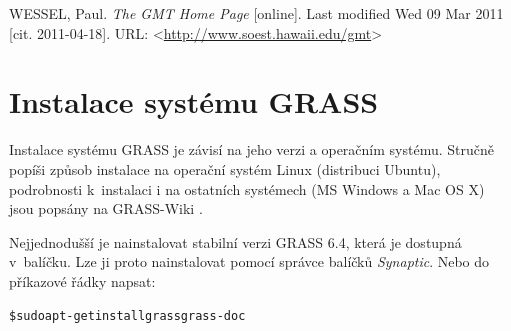 \documentclass[a4paper,12pt,draft]{article}
\begin{document}
\begin{thebibliography}{99}
WESSEL, Paul. \textit{The GMT Home Page} [online]. Last modified Wed 09 Mar 2011
[cit. 2011-04-18].
URL: \textless\url{http://www.soest.hawaii.edu/gmt}\textgreater








\end{thebibliography}





\newpage
\appendix
\pagestyle{plain}

\section{Instalace systému GRASS}
\label{priloha:instalace}
Instalace systému GRASS je závisí na jeho verzi a operačním
systému. Stručně popíši způsob instalace na operační systém Linux
(distribuci Ubuntu), podrobnosti k~instalaci i na ostatních systémech
(MS Windows a Mac OS X) jsou popsány na GRASS-Wiki \cite{instalace}.

Nejjednodušší je nainstalovat stabilní verzi GRASS 6.4, která je
dostupná v~ba\-líčku. Lze ji proto nainstalovat pomocí správce balíčků
\emph{Synaptic}. Nebo do příkazové řádky napsat:
\begin{alltt}
{\footnotesize \$ sudo apt-get install grass grass-doc}
\end{alltt}
\end{document}
